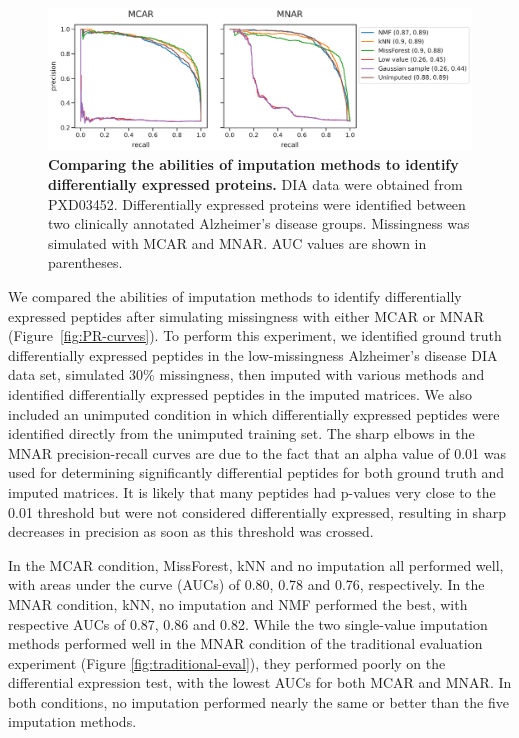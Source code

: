 \documentclass{article}
\begin{document}
\begin{figure}
  \centering
  \includegraphics[width=1.0\textwidth]{figures/differential-expression-DIA-protein-figure.pdf}
  \caption{{\bf Comparing the abilities of imputation methods to identify differentially expressed proteins.} DIA data were obtained from PXD03452. Differentially expressed proteins were identified between two clinically annotated Alzheimer's disease groups. Missingness was simulated with MCAR and MNAR. AUC values are shown in parentheses.}
  \label{fig:PR-curves-protein}
\end{figure}
 
We compared the abilities of imputation methods to identify differentially expressed peptides after simulating missingness with either MCAR or MNAR (Figure~\ref{fig:PR-curves}). To perform this experiment, we identified ground truth differentially expressed peptides in the low-missingness Alzheimer's disease DIA data set, simulated 30\% missingness, then imputed with various methods and identified differentially expressed peptides in the imputed matrices. We also included an unimputed condition in which differentially expressed peptides were identified directly from the unimputed training set. The sharp elbows in the MNAR precision-recall curves are due to the fact that an alpha value of 0.01 was used for determining significantly differential peptides for both ground truth and imputed matrices. It is likely that many peptides had p-values very close to the 0.01 threshold but were not considered differentially expressed, resulting in sharp decreases in precision as soon as this threshold was crossed.

In the MCAR condition, MissForest, kNN and no imputation all performed well, with areas under the curve (AUCs) of 0.80, 0.78 and 0.76, respectively. In the MNAR condition, kNN, no imputation and NMF performed the best, with respective AUCs of 0.87, 0.86 and 0.82. While the two single-value imputation methods performed well in the MNAR condition of the traditional evaluation experiment (Figure \ref{fig:traditional-eval}), they performed poorly on the differential expression test, with the lowest AUCs for both MCAR and MNAR. In both conditions, no imputation performed nearly the same or better than the five imputation methods. 
\end{document}
